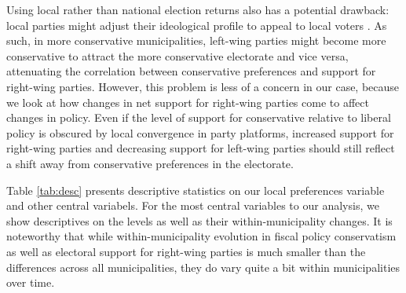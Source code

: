 \documentclass[a4paper,12pt]{article}
\begin{document}
Using local rather than national election returns also has a potential drawback: local parties might adjust their ideological profile to appeal to local voters \citep{erikson1993statehouse}. As such, in more conservative municipalities, left-wing parties might become more conservative to attract the more conservative electorate and vice versa, attenuating the correlation between conservative preferences and support for right-wing parties. However, this problem is less of a concern in our case, because we look at how changes in net support for right-wing parties come to affect changes in policy. Even if the level of support for conservative relative to liberal policy is obscured by local convergence in party platforms, increased support for right-wing parties and decreasing support for left-wing parties should still reflect a shift away from conservative preferences in the electorate.

Table \ref{tab:desc} presents descriptive statistics on our local preferences variable and other central variabels. For the most central variables to our analysis, we show descriptives on the levels as well as their within-municipality changes. It is noteworthy that while within-municipality evolution in fiscal policy conservatism as well as electoral support for right-wing parties is much smaller than the differences across all municipalities, they do vary quite a bit within municipalities over time.
\end{document}
